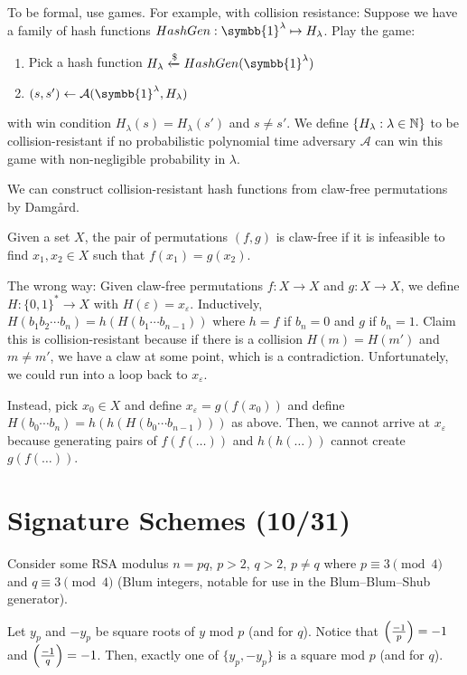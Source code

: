 \documentclass[notes]{agony}
\newcommand{\xgets}{\xleftarrow}
\newcommand{\one}{\symbb{1}}
\newcommand{\leg}[2]{\qty(\frac{#1}{#2})}
\begin{document}
To be formal, use games.
For example, with collision resistance:
Suppose we have a family of hash functions $HashGen : \one^\lambda \mapsto H_\lambda$.
Play the game:
\begin{enumerate}[1.]
  \item Pick a hash function $H_\lambda \xgets{\$} HashGen(\one^\lambda)$
  \item $(s, s') \gets \mathcal A(\one^\lambda, H_\lambda)$
\end{enumerate}
with win condition $H_\lambda(s) = H_\lambda(s')$ and $s \neq s'$.
We define $\{H_\lambda : \lambda \in \mathbb{N}\}$
to be collision-resistant if no probabilistic polynomial time adversary $\mathcal A$
can win this game with non-negligible probability in $\lambda$.

We can construct collision-resistant hash functions
from claw-free permutations by Damg\aa{}rd.

\begin{defn}
  Given a set $X$, the pair of permutations $(f,g)$ is claw-free if
  it is infeasible to find $x_1,x_2 \in X$ such that $f(x_1) = g(x_2)$.
\end{defn}

The wrong way:
Given claw-free permutations $f : X \to X$ and $g : X \to X$,
we define $H : \{0,1\}^* \to X$ with $H(\varepsilon) = x_\varepsilon$.
Inductively, $H(b_1b_2\cdots b_n) = h(H(b_1\cdots b_{n-1}))$
where $h = f$ if $b_n = 0$ and $g$ if $b_n = 1$.
Claim this is collision-resistant because if there is a collision
$H(m) = H(m')$ and $m \neq m'$, we have a claw at some point,
which is a contradiction.
Unfortunately, we could run into a loop back to $x_\varepsilon$.

Instead, pick $x_0 \in X$ and define $x_\varepsilon = g(f(x_0))$
and define $H(b_0\cdots b_n) = h(h(H(b_0 \cdots b_{n-1})))$ as above.
Then, we cannot arrive at $x_\varepsilon$
because generating pairs of $f(f(\dots))$ and $h(h(\dots))$ cannot create $g(f(\dots))$.

\section{Signature Schemes (10/31)}

Consider some RSA modulus $n = pq$, $p > 2$, $q > 2$, $p \neq q$
where $p \equiv 3 \pmod 4$ and $q \equiv 3 \pmod 4$ (Blum integers,
notable for use in the Blum--Blum--Shub generator).

Let $y_p$ and $-y_p$ be square roots of $y$ mod $p$ (and for $q$).
Notice that $\leg{-1}{p} = -1$ and $\leg{-1}{q} = -1$.
Then, exactly one of $\{y_p,-y_p\}$ is a square mod $p$ (and for $q$).
\end{document}
